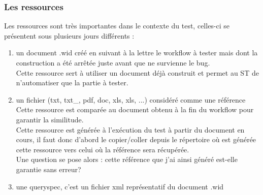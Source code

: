 \subsubsection{Les ressources}
Les ressources sont tr\`{e}s importantes dans le contexte du test, celles-ci se pr\'{e}sentent sous plusieurs jours diff\'{e}rents :
\begin{enumerate}
	\item un document .wid cr\'{e}é en suivant \`{a} la lettre le workflow \`{a} tester mais dont la construction a \'{e}t\'{e} arr\^{e}t\'{e}e juste avant que ne survienne le bug.\\
	Cette ressource sert \`{a} utiliser un document d\'{e}j\`{a} construit et permet au ST de n'automatiser que la partie \`{a} tester.
	\item un fichier (txt, txt\_, pdf, doc, xls, xls, ...) consid\'{e}r\'{e} comme une r\'{e}f\'{e}rence\\
	Cette ressource est compar\'{e}e au document obtenu \`{a} la fin du workflow pour garantir la similitude.\\
	Cette ressource est générée à l'exécution du test à partir du document en cours, il faut donc d'abord le copier/coller depuis le répertoire où est générée cette ressource vers celui où la référence sera récupérée.\\
	Une question se pose alors : cette référence que j'ai ainsi généré est-elle garantie sans erreur?
	\item une queryspec, c'est un fichier xml repr\'{e}sentatif du document .wid
\end{enumerate}


